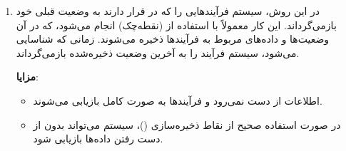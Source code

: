 \begin{qsolve}
\begin{enumerate}
		
		\item {}
		در این روش، سیستم فرآیندهایی را که در  قرار دارند به وضعیت قبلی خود بازمی‌گرداند. این کار معمولاً با استفاده از  (نقطه‌چک) انجام می‌شود، که در آن وضعیت‌ها و داده‌های مربوط به فرآیندها ذخیره می‌شوند. زمانی که  شناسایی می‌شود، سیستم فرآیند را به آخرین وضعیت ذخیره‌شده بازمی‌گرداند.
		
		\textbf{مزایا}:
		\begin{itemize}
			\item اطلاعات از دست نمی‌رود و فرآیندها به صورت کامل بازیابی می‌شوند.
			\item در صورت استفاده صحیح از نقاط ذخیره‌سازی ()، سیستم می‌تواند بدون از دست رفتن داده‌ها بازیابی شود.
		\end{itemize}
	\end{enumerate}
\end{qsolve}
\newpage


